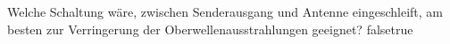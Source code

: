     {Welche Schaltung wäre, zwischen Senderausgang und Antenne eingeschleift, am besten zur Verringerung der Oberwellenausstrahlungen geeignet?}
    {}
    {}
    {}
    {}
    {false}{true}